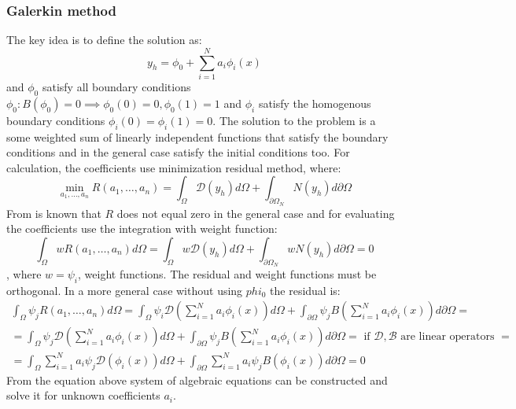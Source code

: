 \subsubsection{Galerkin method}
The key idea is to define the solution as:
\begin{equation}
	\label{eq:galerkin_presentation}
	y_h = \phi_0 + \sum_{i = 1}^N a_i \phi_i(x)
\end{equation}
and $\phi_0$ satisfy all boundary conditions $\phi_0: B(\phi_0) = 0 \implies \phi_0(0) = 0, \phi_0(1) = 1$ and $\phi_i$ satisfy the homogenous boundary conditions $\phi_i(0) = \phi_i(1) = 0$. The solution to the problem is a some weighted sum of linearly independent functions that satisfy the boundary conditions and in the general case satisfy the initial conditions too. For calculation, the coefficients use minimization residual method, where:
\begin{equation*}
	\min_{a_1, \dots, a_n} R(a_1, \dots, a_n) = \int_{\Omega} \mathcal{D}(y_h) d\Omega + \int_{\partial \Omega_N} N(y_h) d\partial \Omega
\end{equation*}
From \cite{fletcher2012computational} is known that $R$ does not equal zero in the general case and for evaluating the coefficients use the integration with weight function:
\begin{equation*}
	\int_{\Omega} w R(a_1, \dots, a_n) d\Omega = \int_{\Omega} w \mathcal{D}(y_h) d\Omega + \int_{\partial \Omega_N} w N(y_h) d\partial \Omega = 0
\end{equation*}
, where $w = \psi_i$, weight functions. The residual and weight functions must be orthogonal.
In a more general case without using $phi_0$ the residual is:
\begin{equation*} 
	\begin{multlined}
		\int_{\Omega} \psi_j R(a_1, \dots, a_n) d\Omega = \int_{\Omega} \psi_i \mathcal{D} \left ( \sum_{i = 1}^N a_i \phi_i(x) \right ) d\Omega + \int_{\partial \Omega} \psi_j B \left ( \sum_{i = 1}^N a_i \phi_i(x) \right ) d\partial \Omega = \\ =
		\int_{\Omega} \psi_j \mathcal{D} \left ( \sum_{i = 1}^N a_i \phi_i(x) \right ) d\Omega + \int_{\partial \Omega} \psi_j B \left ( \sum_{i = 1}^N a_i \phi_i(x) \right ) d\partial \Omega = \text{ if $\mathcal{D}, \mathcal{B}$ are linear operators } = \\ = \int_{\Omega} \sum_{i = 1}^N  a_i \psi_j \mathcal{D}(\phi_i(x)) d\Omega + \int_{\partial \Omega} \sum_{i = 1}^N  a_i \psi_j B(\phi_i(x)) d\partial \Omega = 0
	\end{multlined}
\end{equation*}
From the equation above system of algebraic equations can be constructed and solve it for unknown coefficients $a_i$.

